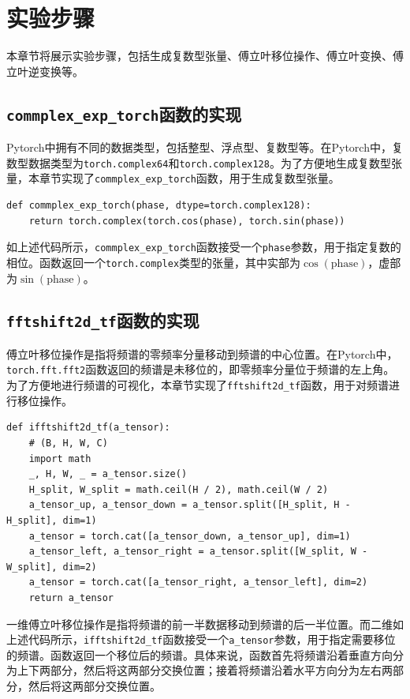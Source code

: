 \section{实验步骤}

本章节将展示实验步骤，包括生成复数型张量、傅立叶移位操作、傅立叶变换、傅立叶逆变换等。

\subsection{\texttt{commplex\_exp\_torch}函数的实现}

Pytorch中拥有不同的数据类型，包括整型、浮点型、复数型等。在Pytorch中，复数型数据类型为\texttt{torch.complex64}和\texttt{torch.complex128}。为了方便地生成复数型张量，本章节实现了\texttt{commplex\_exp\_torch}函数，用于生成复数型张量。

\begin{lstlisting}[style=Python]
def commplex_exp_torch(phase, dtype=torch.complex128):
    return torch.complex(torch.cos(phase), torch.sin(phase))
\end{lstlisting}

如上述代码所示，\texttt{commplex\_exp\_torch}函数接受一个\texttt{phase}参数，用于指定复数的相位。函数返回一个\texttt{torch.complex}类型的张量，其中实部为$\cos(\text{phase})$，虚部为$\sin(\text{phase})$。

\subsection{\texttt{fftshift2d\_tf}函数的实现}

傅立叶移位操作是指将频谱的零频率分量移动到频谱的中心位置。在Pytorch中，\texttt{torch.fft.fft2}函数返回的频谱是未移位的，即零频率分量位于频谱的左上角。为了方便地进行频谱的可视化，本章节实现了\texttt{fftshift2d\_tf}函数，用于对频谱进行移位操作。

\begin{lstlisting}[style=Python]
def ifftshift2d_tf(a_tensor):
    # (B, H, W, C)
    import math
    _, H, W, _ = a_tensor.size()
    H_split, W_split = math.ceil(H / 2), math.ceil(W / 2)
    a_tensor_up, a_tensor_down = a_tensor.split([H_split, H - H_split], dim=1)
    a_tensor = torch.cat([a_tensor_down, a_tensor_up], dim=1)
    a_tensor_left, a_tensor_right = a_tensor.split([W_split, W - W_split], dim=2)
    a_tensor = torch.cat([a_tensor_right, a_tensor_left], dim=2)
    return a_tensor
\end{lstlisting}

一维傅立叶移位操作是指将频谱的前一半数据移动到频谱的后一半位置。而二维如上述代码所示，\texttt{ifftshift2d\_tf}函数接受一个\texttt{a\_tensor}参数，用于指定需要移位的频谱。函数返回一个移位后的频谱。具体来说，函数首先将频谱沿着垂直方向分为上下两部分，然后将这两部分交换位置；接着将频谱沿着水平方向分为左右两部分，然后将这两部分交换位置。

